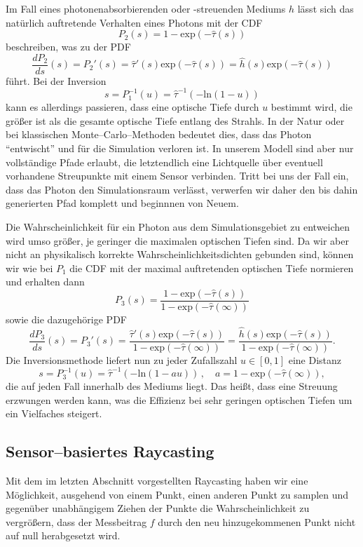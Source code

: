 	Im Fall eines photonenabsorbierenden oder -streuenden Mediums $h$ lässt sich das natürlich auftretende Verhalten eines Photons mit der CDF
	$$P_2(s)=1-\text{exp}(-{\hat \tau}(s))$$
	beschreiben, was zu der PDF
	$$\frac{dP_2}{ds}(s)=P_2'(s)={\hat \tau}'(s)\text{exp}(-{\hat \tau}(s))={\hat h}(s)\text{exp}(-{\hat \tau}(s))$$
	führt. Bei der Inversion
	$$s=P_1^{-1}(u)={\hat \tau}^{-1}\left(-\text{ln}(1-u)\right)$$
	kann es allerdings passieren, dass eine optische Tiefe durch $u$ bestimmt wird, die größer ist als die gesamte optische Tiefe entlang des Strahls. In der Natur oder bei klassischen Monte--Carlo--Methoden bedeutet dies, dass das Photon ``entwischt'' und für die Simulation verloren ist. In unserem Modell sind aber nur vollständige Pfade erlaubt, die letztendlich eine Lichtquelle über eventuell vorhandene Streupunkte mit einem Sensor verbinden. Tritt bei uns der Fall ein, dass das Photon den Simulationsraum verlässt, verwerfen wir daher den bis dahin generierten Pfad komplett und beginnnen von Neuem.
	
	Die Wahrscheinlichkeit für ein Photon aus dem Simulationsgebiet zu entweichen wird umso größer, je geringer die maximalen optischen Tiefen sind. Da wir aber nicht an physikalisch korrekte Wahrscheinlichkeitsdichten gebunden sind, können wir wie bei $P_1$ die CDF mit der maximal auftretenden optischen Tiefe normieren und erhalten dann
	$$P_3(s)=\frac{1-\text{exp}(-{\hat \tau}(s))}{1-\text{exp}(-{\hat \tau}(\infty))}$$
	sowie die dazugehörige PDF
	$$\frac{dP_3}{ds}(s)=P_3'(s)=\frac{{\hat \tau}'(s)\text{exp}(-{\hat \tau}(s))}{1-\text{exp}(-{\hat \tau}(\infty))}=\frac{{\hat h}(s)\text{exp}(-{\hat \tau}(s))}{1-\text{exp}(-{\hat \tau}(\infty))}.$$
	Die Inversionsmethode liefert nun zu jeder Zufallszahl $u\in[0,1]$ eine Distanz
	\begin{equation}
    s=P_3^{-1}(u)={\hat \tau}^{-1}\left(-\text{ln}(1-a u)\right)\,,\quad a=1-\text{exp}(-{\hat \tau}(\infty)),
    \label{eq:enforced_scattering_distancesampler}
	\end{equation}
	die auf jeden Fall innerhalb des Mediums liegt. Das heißt, dass eine Streuung erzwungen werden kann, was die Effizienz bei sehr geringen optischen Tiefen um ein Vielfaches steigert.
	
	\subsection{Sensor--basiertes Raycasting}\label{subsec:sensor_based_raycasting}
	Mit dem im letzten Abschnitt vorgestellten Raycasting haben wir eine Möglichkeit, ausgehend von einem Punkt, einen anderen Punkt zu samplen und gegenüber unabhängigem Ziehen der Punkte die Wahrscheinlichkeit zu vergrößern, dass der Messbeitrag $f$ durch den neu hinzugekommenen Punkt nicht auf null herabgesetzt wird.
	
